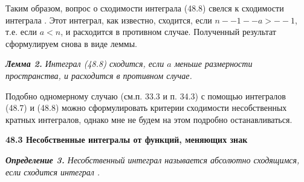 ﻿\documentclass[a4paper,12pt]{book}
\begin{document}
Таким образом, вопрос о сходимости интеграла (48.8) свелся к сходимости интеграла %
. Этот интеграл, как известно, сходится, если $n -- 1 -- a > --1$, т.е. если $a < n$, и расходится в противном случае. Полученный результат сформулируем снова в виде леммы.

\slshape {{\bfseries {Лемма 2.}} Интеграл (48.8) сходится, если $a$
меньше размерности пространства, и расходится в противном случае.}

Подобно одномерному случаю (см.п. 33.3 и п. 34.3) с помощью интегралов (48.7) и (48.8) можно сформулировать 
критерии сходимости несобственных кратных интегралов, однако мне не будем на этом подробно останавливаться.

\begin{center}
\bfseries {48.3 Несобственные интегралы от функций, меняющих знак}
\end{center}

\slshape {{\bfseries {Определение 3.}} Несобственный интеграл %
называется абсолютно сходящимся, если сходится интеграл %
.}
\end{document}
